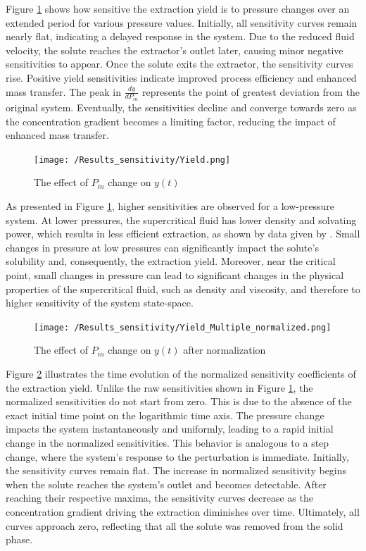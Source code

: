 \documentclass[a4paper,fleqn]{cas-dc}
\begin{document}
	Figure \ref{fig:Sensitivty_P_y} shows how sensitive the extraction yield is to pressure changes over an extended period for various pressure values. Initially, all sensitivity curves remain nearly flat, indicating a delayed response in the system. Due to the reduced fluid velocity, the solute reaches the extractor's outlet later, causing minor negative sensitivities to appear. Once the solute exits the extractor, the sensitivity curves rise. Positive yield sensitivities indicate improved process efficiency and enhanced mass transfer. The peak in $\frac{dy}{dP_{in}}$ represents the point of greatest deviation from the original system. Eventually, the sensitivities decline and converge towards zero as the concentration gradient becomes a limiting factor, reducing the impact of enhanced mass transfer.
	
	\begin{figure}[!ht]
		\centering
		\texttt{[image: /Results\_sensitivity/Yield.png]}
		\caption{The effect of $P_{in}$ change on $y(t)$}
		\label{fig:Sensitivty_P_y}
	\end{figure}
	
	As presented in Figure \ref{fig:Sensitivty_P_y}, higher sensitivities are observed for a low-pressure system. At lower pressures, the supercritical fluid has lower density and solvating power, which results in less efficient extraction, as shown by data given by \citet{Sliczniuk2024}. Small changes in pressure at low pressures can significantly impact the solute's solubility and, consequently, the extraction yield. Moreover, near the critical point, small changes in pressure can lead to significant changes in the physical properties of the supercritical fluid, such as density and viscosity, and therefore to higher sensitivity of the system state-space.
	
	\begin{figure}[!hb]
		\centering
		\texttt{[image: /Results\_sensitivity/Yield\_Multiple\_normalized.png]}
		\caption{The effect of $P_{in}$ change on $y(t)$ after normalization}
		\label{fig:Sensitivty_P_y_norm}
	\end{figure}
			
	Figure \ref{fig:Sensitivty_P_y_norm} illustrates the time evolution of the normalized sensitivity coefficients of the extraction yield. Unlike the raw sensitivities shown in Figure \ref{fig:Sensitivty_P_y}, the normalized sensitivities do not start from zero. This is due to the absence of the exact initial time point on the logarithmic time axis. The pressure change impacts the system instantaneously and uniformly, leading to a rapid initial change in the normalized sensitivities. This behavior is analogous to a step change, where the system's response to the perturbation is immediate. Initially, the sensitivity curves remain flat. The increase in normalized sensitivity begins when the solute reaches the system's outlet and becomes detectable. After reaching their respective maxima, the sensitivity curves decrease as the concentration gradient driving the extraction diminishes over time. Ultimately, all curves approach zero, reflecting that all the solute was removed from the solid phase.
	
\end{document}
